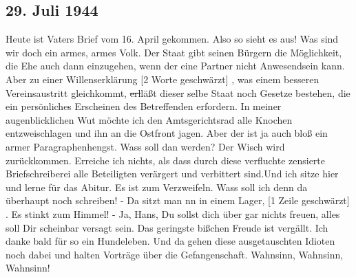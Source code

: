 \subsection{29. Juli 1944}

Heute ist Vaters Brief vom 16. April gekommen.
Also so sieht es aus!
Was sind wir doch ein armes, armes Volk.
Der Staat gibt seinen B\"{u}rgern die M\"{o}glichkeit, die Ehe auch dann einzugehen, wenn der eine Partner nicht Anwesendsein kann.
Aber zu einer Willenserkl\"{a}rung {\color{red} [2 Worte geschw\"{a}rzt] }, was einem besseren Vereinsaustritt gleichkommt, \st{erl}l\"{a}{\ss}t dieser selbe Staat noch Gesetze bestehen, die ein pers\"{o}nliches Erscheinen des Betreffenden erfordern.
In meiner augenblicklichen Wut m\"{o}chte ich den Amtsgerichtsrad alle Knochen entzweischlagen und ihn an die Ostfront jagen.
Aber der ist ja auch blo{\ss} ein armer Paragraphenhengst.
Wass soll dan werden?
Der Wisch wird zur\"{u}ckkommen.
Erreiche ich nichts, als dass durch diese verfluchte zensierte Briefschreiberei alle Beteiligten ver\"{a}rgert und verbittert sind.Und ich sitze hier und lerne f\"{u}r das Abitur.
Es ist zum Verzweifeln.
Wass soll ich denn da \"{u}berhaupt noch schreiben!
- Da sitzt man nn in einem Lager, {\color{red} [1 Zeile geschw\"{a}rzt] }.
Es stinkt zum Himmel!
- Ja, Hans, Du sollst dich \"{u}ber gar nichts freuen, alles soll Dir scheinbar versagt sein.
Das geringste bi{\ss}chen Freude ist verg\"{a}llt.
Ich danke bald f\"{u}r so ein Hundeleben.
Und da gehen diese ausgetauschten Idioten noch dabei und halten Vortr\"{a}ge \"{u}ber die Gefangenschaft.
Wahnsinn, Wahnsinn, Wahnsinn!

\clearpage
